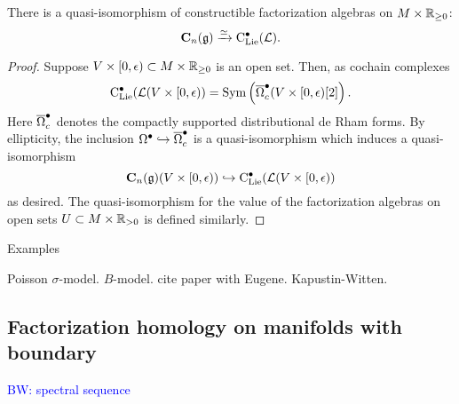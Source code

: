 \documentclass[11pt]{amsart}
\numberwithin{equation}{section}
\def\brian{\textcolor{blue}{BW: }\textcolor{blue}}
\begin{document}
\begin{prp}
There is a quasi-isomorphism of constructible factorization algebras on $M \times \mathbb R_{\geq 0}$:
\[
\mathbf C_n (\mathfrak g) \xrightarrow{\simeq} {\rm C}_{\rm Lie}^\bullet(\mathcal L) .
\]
\end{prp}

\begin{proof}
Suppose $V \times [0,\epsilon) \subset M \times \mathbb R_{\geq 0}$ is an open set. 
Then, as cochain complexes 
\[
{\rm C}_{{\rm Lie}}^\bullet(\mathcal L(V \times [0,\epsilon)) = {\rm Sym} \left(\overline{\Omega}^\bullet_c(V \times [0,\epsilon) [2] \right)  .
\]
Here $\overline{\Omega}^\bullet_c$ denotes the compactly supported distributional de Rham forms. 
By ellipticity, the inclusion $\Omega^\bullet \hookrightarrow \overline{\Omega}^\bullet_c$ is a quasi-isomorphism which induces a quasi-isomorphism
\[
\mathbf C_n(\mathfrak g) (V \times [0,\epsilon)) \hookrightarrow {\rm C}_{{\rm Lie}}^\bullet(\mathcal L(V \times [0,\epsilon)) 
\]
as desired. 
The quasi-isomorphism for the value of the factorization algebras on open sets $U \subset M \times \mathbb R_{>0}$ is defined similarly. 
\end{proof}


\begin{rmk} Examples

Poisson $\sigma$-model. 
$B$-model. 
cite paper with Eugene.
Kapustin-Witten. 
\end{rmk}

\subsection{Factorization homology on manifolds with boundary}

\brian{spectral sequence}
\end{document}
